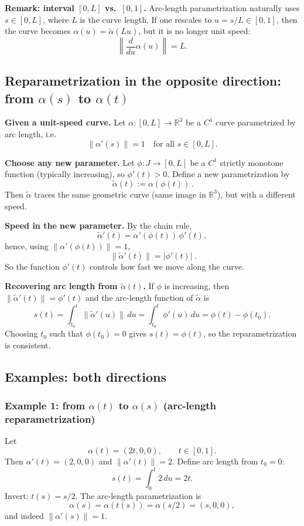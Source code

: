 \documentclass[12pt,a4paper]{article}
\theoremstyle{plain}
\theoremstyle{definition}      %
\begin{document}
	\medskip
	\noindent\textbf{Remark: interval $[0,L]$ vs.\ $[0,1]$.}
	Arc-length parametrization naturally uses $s\in[0,L]$, where $L$ is the curve length.
	If one rescales to $u=s/L\in[0,1]$, then the curve becomes $\alpha(u)=\widetilde\alpha(Lu)$, but it is no longer unit speed:
	\[
	\left\|\frac{d}{du}\alpha(u)\right\|=L.
	\]
	
	\subsection*{Reparametrization in the opposite direction: from $\alpha(s)$ to $\alpha(t)$}
	
	\noindent\textbf{Given a unit-speed curve.}
	Let $\alpha:[0,L]\to\mathbb{R}^3$ be a $C^1$ curve parametrized by arc length, i.e.
	\[
	\|\alpha'(s)\|=1\quad\text{for all }s\in[0,L].
	\]
	
	\medskip
	\noindent\textbf{Choose any new parameter.}
	Let $\phi:J\to[0,L]$ be a $C^1$ strictly monotone function (typically increasing), so $\phi'(t)>0$.
	Define a new parametrization by
	\[
	\boxed{\ \widetilde\alpha(t):=\alpha(\phi(t))\ }.
	\]
	Then $\widetilde\alpha$ traces the same geometric curve (same image in $\mathbb{R}^3$), but with a different speed.
	
	\medskip
	\noindent\textbf{Speed in the new parameter.}
	By the chain rule,
	\[
	\widetilde\alpha'(t)=\alpha'(\phi(t))\,\phi'(t),
	\]
	hence, using $\|\alpha'(\phi(t))\|=1$,
	\[
	\boxed{\ \|\widetilde\alpha'(t)\|=|\phi'(t)|\ }.
	\]
	So the function $\phi'(t)$ controls how fast we move along the curve.
	
	\medskip
	\noindent\textbf{Recovering arc length from $\widetilde\alpha(t)$.}
	If $\phi$ is increasing, then $\|\widetilde\alpha'(t)\|=\phi'(t)$ and the arc-length function of $\widetilde\alpha$ is
	\[
	s(t)=\int_{t_0}^{t}\|\widetilde\alpha'(u)\|\,du=\int_{t_0}^{t}\phi'(u)\,du=\phi(t)-\phi(t_0).
	\]
	Choosing $t_0$ such that $\phi(t_0)=0$ gives $s(t)=\phi(t)$, so the reparametrization is consistent.
	
	\subsection*{Examples: both directions}
	
	\subsubsection*{Example 1: from $\alpha(t)$ to $\alpha(s)$ (arc-length reparametrization)}
	Let
	\[
	\alpha(t)=(2t,0,0),\qquad t\in[0,1].
	\]
	Then $\alpha'(t)=(2,0,0)$ and $\|\alpha'(t)\|=2$. Define arc length from $t_0=0$:
	\[
	s(t)=\int_0^t 2\,du=2t.
	\]
	Invert: $t(s)=s/2$. The arc-length parametrization is
	\[
	\alpha(s)=\alpha(t(s))=\alpha(s/2)=(s,0,0),
	\]
	and indeed $\|\alpha'(s)\|=1$.
	
\end{document}
